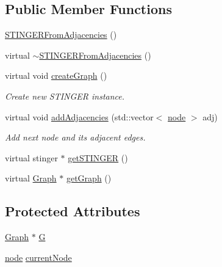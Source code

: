 \subsection*{Public Member Functions}
\begin{DoxyCompactItemize}
\item 
\hyperlink{class_ensemble_clustering_1_1_s_t_i_n_g_e_r_from_adjacencies_abe244c39398307e20829ee66dee1ce09}{S\-T\-I\-N\-G\-E\-R\-From\-Adjacencies} ()
\item 
virtual \hyperlink{class_ensemble_clustering_1_1_s_t_i_n_g_e_r_from_adjacencies_aa521cce70dc5cfb1227bf8ba8e08f7e3}{$\sim$\-S\-T\-I\-N\-G\-E\-R\-From\-Adjacencies} ()
\item 
virtual void \hyperlink{class_ensemble_clustering_1_1_s_t_i_n_g_e_r_from_adjacencies_af4f5ba6e752d80f9d062a7f185ad14c4}{create\-Graph} ()
\begin{DoxyCompactList}\small\item\em Create new S\-T\-I\-N\-G\-E\-R instance. \end{DoxyCompactList}\item 
virtual void \hyperlink{class_ensemble_clustering_1_1_s_t_i_n_g_e_r_from_adjacencies_a0057c2a5ea2a4521f51d1f03593e98ad}{add\-Adjacencies} (std\-::vector$<$ \hyperlink{namespace_ensemble_clustering_ae829290aeccd1a420b17a37fd901f114}{node} $>$ adj)
\begin{DoxyCompactList}\small\item\em Add next node and its adjacent edges. \end{DoxyCompactList}\item 
virtual stinger $\ast$ \hyperlink{class_ensemble_clustering_1_1_s_t_i_n_g_e_r_from_adjacencies_a3d19e2860c0a1d2e4e43f87523dfd97a}{get\-S\-T\-I\-N\-G\-E\-R} ()
\item 
virtual \hyperlink{class_ensemble_clustering_1_1_graph}{Graph} $\ast$ \hyperlink{class_ensemble_clustering_1_1_s_t_i_n_g_e_r_from_adjacencies_a67ea2ddaa606d7de19ab51b495edf6ec}{get\-Graph} ()
\end{DoxyCompactItemize}
\subsection*{Protected Attributes}
\begin{DoxyCompactItemize}
\item 
\hyperlink{class_ensemble_clustering_1_1_graph}{Graph} $\ast$ \hyperlink{class_ensemble_clustering_1_1_s_t_i_n_g_e_r_from_adjacencies_a5376c951560b41a3a6ad24edddf143ee}{G}
\item 
\hyperlink{namespace_ensemble_clustering_ae829290aeccd1a420b17a37fd901f114}{node} \hyperlink{class_ensemble_clustering_1_1_s_t_i_n_g_e_r_from_adjacencies_a5ee544e2493998867bd1cd7e98d72575}{current\-Node}
\end{DoxyCompactItemize}


